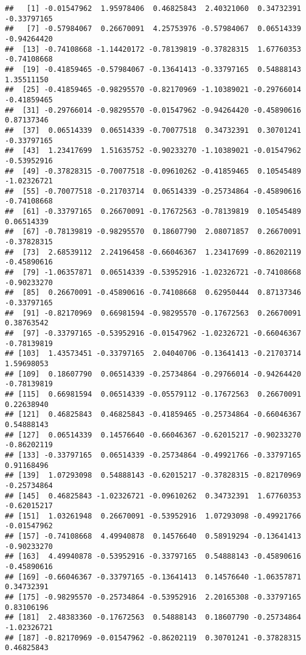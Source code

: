 \documentclass[
]{book}
\theoremstyle{definition}
\theoremstyle{definition}
\theoremstyle{definition}
\theoremstyle{definition}
\theoremstyle{remark}
\begin{document}
\begin{verbatim}
##   [1] -0.01547962  1.95978406  0.46825843  2.40321060  0.34732391 -0.33797165
##   [7] -0.57984067  0.26670091  4.25753976 -0.57984067  0.06514339 -0.94264420
##  [13] -0.74108668 -1.14420172 -0.78139819 -0.37828315  1.67760353 -0.74108668
##  [19] -0.41859465 -0.57984067 -0.13641413 -0.33797165  0.54888143  1.35511150
##  [25] -0.41859465 -0.98295570 -0.82170969 -1.10389021 -0.29766014 -0.41859465
##  [31] -0.29766014 -0.98295570 -0.01547962 -0.94264420 -0.45890616  0.87137346
##  [37]  0.06514339  0.06514339 -0.70077518  0.34732391  0.30701241 -0.33797165
##  [43]  1.23417699  1.51635752 -0.90233270 -1.10389021 -0.01547962 -0.53952916
##  [49] -0.37828315 -0.70077518 -0.09610262 -0.41859465  0.10545489 -1.02326721
##  [55] -0.70077518 -0.21703714  0.06514339 -0.25734864 -0.45890616 -0.74108668
##  [61] -0.33797165  0.26670091 -0.17672563 -0.78139819  0.10545489  0.06514339
##  [67] -0.78139819 -0.98295570  0.18607790  2.08071857  0.26670091 -0.37828315
##  [73]  2.68539112  2.24196458 -0.66046367  1.23417699 -0.86202119 -0.45890616
##  [79] -1.06357871  0.06514339 -0.53952916 -1.02326721 -0.74108668 -0.90233270
##  [85]  0.26670091 -0.45890616 -0.74108668  0.62950444  0.87137346 -0.33797165
##  [91] -0.82170969  0.66981594 -0.98295570 -0.17672563  0.26670091  0.38763542
##  [97] -0.33797165 -0.53952916 -0.01547962 -1.02326721 -0.66046367 -0.78139819
## [103]  1.43573451 -0.33797165  2.04040706 -0.13641413 -0.21703714  1.59698053
## [109]  0.18607790  0.06514339 -0.25734864 -0.29766014 -0.94264420 -0.78139819
## [115]  0.66981594  0.06514339 -0.05579112 -0.17672563  0.26670091  0.22638940
## [121]  0.46825843  0.46825843 -0.41859465 -0.25734864 -0.66046367  0.54888143
## [127]  0.06514339  0.14576640 -0.66046367 -0.62015217 -0.90233270 -0.86202119
## [133] -0.33797165  0.06514339 -0.25734864 -0.49921766 -0.33797165  0.91168496
## [139]  1.07293098  0.54888143 -0.62015217 -0.37828315 -0.82170969 -0.25734864
## [145]  0.46825843 -1.02326721 -0.09610262  0.34732391  1.67760353 -0.62015217
## [151]  1.03261948  0.26670091 -0.53952916  1.07293098 -0.49921766 -0.01547962
## [157] -0.74108668  4.49940878  0.14576640  0.58919294 -0.13641413 -0.90233270
## [163]  4.49940878 -0.53952916 -0.33797165  0.54888143 -0.45890616 -0.45890616
## [169] -0.66046367 -0.33797165 -0.13641413  0.14576640 -1.06357871  0.34732391
## [175] -0.98295570 -0.25734864 -0.53952916  2.20165308 -0.33797165  0.83106196
## [181]  2.48383360 -0.17672563  0.54888143  0.18607790 -0.25734864 -1.02326721
## [187] -0.82170969 -0.01547962 -0.86202119  0.30701241 -0.37828315  0.46825843

\end{verbatim}
\end{document}
